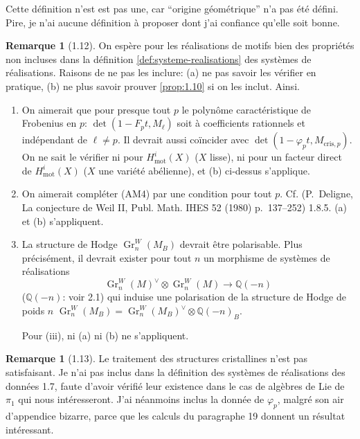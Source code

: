 \documentclass[12pt,a4paper]{article}
\theoremstyle{plain}
\theoremstyle{definition}
\newtheorem{remark}[theorem]{Remarque}
\theoremstyle{remark}
\DeclareMathOperator{\Gr}{Gr}
\newcommand{\mot}{\mathrm{mot}}
\providecommand{\mot}{\mathrm{mot}}
\providecommand{\cris}{\mathrm{cris}}
\begin{document}
Cette d\'efinition n'est est pas une, car ``origine g\'eom\'etrique'' n'a pas \'et\'e
d\'efini. Pire, je n'ai aucune d\'efinition \`a proposer dont j'ai confiance qu'elle soit
bonne.

\begin{remark}[1.12]\label{rem:1.12}
On esp\`ere pour les r\'ealisations de motifs bien des propri\'et\'es non incluses dans la
d\'efinition \ref{def:systeme-realisations} des syst\`emes de r\'ealisations. Raisons de ne
pas les inclure: (a) ne pas savoir les v\'erifier en pratique, (b) ne plus savoir prouver
\ref{prop:1.10} si on les inclut. Ainsi.

\begin{enumerate}[label=(\roman*)]
\item On aimerait que pour presque tout $p$ le polyn\^ome caract\'eristique de Frobenius
en $p$: $\det(1 - F_p t, M_\ell)$ soit \`a coefficients rationnels et ind\'ependant de
$\ell \neq p$. Il devrait aussi coïncider avec $\det(1 - \varphi_p t, M_{\cris,p})$. On ne sait le v\'erifier ni pour
$H^i_\mot(X)$ ($X$ lisse), ni pour un facteur direct de $H^i_\mot(X)$ ($X$ une vari\'et\'e
ab\'elienne), et (b) ci-dessus s'applique.

\item On aimerait compl\'eter (AM4) par une condition pour tout $p$. Cf. (P.~Deligne, La
conjecture de Weil II, Publ. Math. IHES 52 (1980) p.~137--252) 1.8.5. (a) et (b)
s'appliquent.

\item La structure de Hodge $\Gr^W_n(M_B)$ devrait \^etre polarisable. Plus pr\'ecis\'ement,
il devrait exister pour tout $n$ un morphisme de syst\`emes de r\'ealisations
\[
\Gr^W_n(M)^\vee \otimes \Gr^W_n(M) \longrightarrow \mathbb{Q}(-n)
\]
($\mathbb{Q}(-n)$: voir 2.1) qui induise une polarisation de la structure de Hodge de
poids $n$ $\Gr^W_n(M_B) = \Gr^W_n(M_B)^\vee \otimes \mathbb{Q}(-n)_B$.

Pour (iii), ni (a) ni (b) ne s'appliquent.
\end{enumerate}
\end{remark}

\begin{remark}[1.13]\label{rem:1.13}
Le traitement des structures cristallines n'est pas satisfaisant. Je n'ai pas inclus dans
la d\'efinition des syst\`emes de r\'ealisations des donn\'ees 1.7, faute d'avoir v\'erifi\'e
leur existence dans le cas de alg\`ebres de Lie de $\pi_1$ qui nous int\'eresseront. J'ai
n\'eanmoins inclus la donn\'ee de $\varphi_p$, malgr\'e son air d'appendice bizarre, parce
que les calculs du paragraphe 19 donnent un r\'esultat int\'eressant.
\end{remark}
\end{document}
